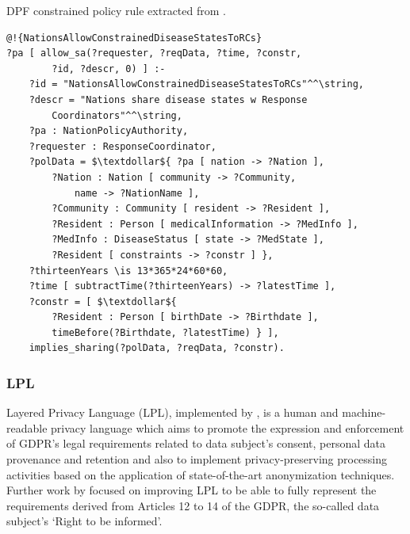 \begin{listing}
\caption{DPF constrained policy rule extracted from \cite{martiny_protecting_2018}.}
\label{list:dpf_example}
\begin{verbatim}
@!{NationsAllowConstrainedDiseaseStatesToRCs}
?pa [ allow_sa(?requester, ?reqData, ?time, ?constr, 
        ?id, ?descr, 0) ] :-
    ?id = "NationsAllowConstrainedDiseaseStatesToRCs"^^\string,
    ?descr = "Nations share disease states w Response 
        Coordinators"^^\string,
    ?pa : NationPolicyAuthority,
    ?requester : ResponseCoordinator,
    ?polData = $\textdollar${ ?pa [ nation -> ?Nation ],
        ?Nation : Nation [ community -> ?Community, 
            name -> ?NationName ],
        ?Community : Community [ resident -> ?Resident ],
        ?Resident : Person [ medicalInformation -> ?MedInfo ],
        ?MedInfo : DiseaseStatus [ state -> ?MedState ],
        ?Resident [ constraints -> ?constr ] },
    ?thirteenYears \is 13*365*24*60*60, 
    ?time [ subtractTime(?thirteenYears) -> ?latestTime ],
    ?constr = [ $\textdollar${ 
        ?Resident : Person [ birthDate -> ?Birthdate ],
        timeBefore(?Birthdate, ?latestTime) } ],
    implies_sharing(?polData, ?reqData, ?constr).
\end{verbatim}
\end{listing}

\subsubsection{LPL}
\label{sec:lpl}

Layered Privacy Language (LPL), implemented by \cite{gerl_lpl_2018}, is a human and machine-readable privacy language which aims to promote the expression and enforcement of GDPR's legal requirements related to data subject's consent, personal data provenance and retention and also to implement privacy-preserving processing activities based on the application of state-of-the-art anonymization techniques. 
Further work by \cite{gerl_critical_2018} focused on improving LPL to be able to fully represent the requirements derived from Articles 12 to 14 of the GDPR, the so-called data subject's `Right to be informed'.

